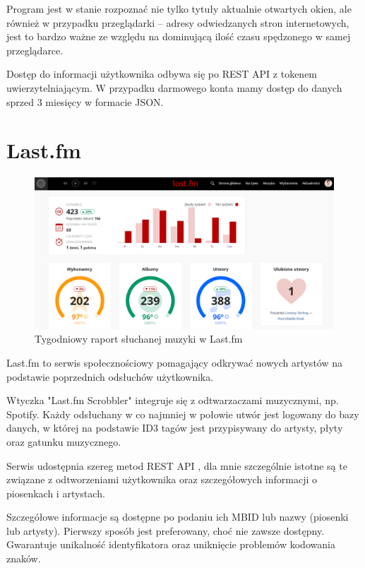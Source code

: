 \documentclass[brudnopis]{xmgr}
\begin{document}
            Program jest w stanie rozpoznać nie tylko tytuły aktualnie otwartych okien,
            ale również w przypadku przeglądarki – adresy odwiedzanych stron internetowych,
            jest to bardzo ważne ze względu na dominującą ilość czasu spędzonego w samej przeglądarce.

            Dostęp do informacji użytkownika odbywa się po REST API z tokenem uwierzytelniającym.
            W przypadku darmowego konta mamy dostęp do danych sprzed 3 miesięcy w formacie JSON.

        \section*{Last.fm}

            \begin{figure}
                \includegraphics[width=\linewidth]{fig/lastfm-weekly.png}
                \caption{Tygodniowy raport słuchanej muzyki w Last.fm}
                \label{fig:lastfm-weekly}
            \end{figure}

            Last.fm to serwis społecznościowy pomagający odkrywać nowych artystów na podstawie poprzednich odsłuchów użytkownika.

            Wtyczka "Last.fm Scrobbler" \cite{lastfm:trackmymusic} integruje się z odtwarzaczami muzycznymi, np. Spotify.
            Każdy odsłuchany w co najmniej w połowie utwór jest logowany do bazy danych,
            w której na podstawie ID3 tagów jest przypisywany do artysty, płyty oraz gatunku muzycznego.

            Serwis udostępnia szereg metod REST API \cite{lastfm:apidoc}, dla mnie szczególnie istotne są te
            związane z odtworzeniami użytkownika oraz szczegółowych informacji o piosenkach i artystach.

            Szczegółowe informacje są dostępne po podaniu ich MBID\cite{lastfm:mbid} lub nazwy (piosenki lub artysty).
            Pierwszy sposób jest preferowany, choć nie zawsze dostępny. Gwarantuje unikalność identyfikatora oraz uniknięcie problemów kodowania znaków.
\end{document}
